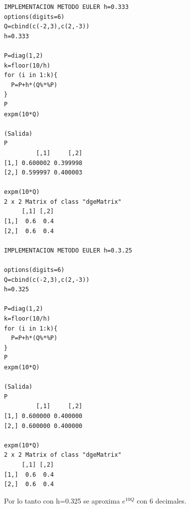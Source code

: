 \documentclass[a5paper,oneside]{amsart}
\theoremstyle{plain}
\theoremstyle{definition}
\begin{document}
\begin{lstlisting}
IMPLEMENTACION METODO EULER h=0.333
options(digits=6)
Q=cbind(c(-2,3),c(2,-3))
h=0.333

P=diag(1,2)
k=floor(10/h)
for (i in 1:k){
  P=P+h*(Q%*%P)
}
P
expm(10*Q)

(Salida)
P
         [,1]     [,2]
[1,] 0.600002 0.399998
[2,] 0.599997 0.400003

expm(10*Q)
2 x 2 Matrix of class "dgeMatrix"
     [,1] [,2]
[1,]  0.6  0.4
[2,]  0.6  0.4

IMPLEMENTACION METODO EULER h=0.3.25

options(digits=6)
Q=cbind(c(-2,3),c(2,-3))
h=0.325

P=diag(1,2)
k=floor(10/h)
for (i in 1:k){
  P=P+h*(Q%*%P)
}
P
expm(10*Q)

(Salida)
P
         [,1]     [,2]
[1,] 0.600000 0.400000
[2,] 0.600000 0.400000

expm(10*Q)
2 x 2 Matrix of class "dgeMatrix"
     [,1] [,2]
[1,]  0.6  0.4
[2,]  0.6  0.4

\end{lstlisting}

Por lo tanto con h=0.325 se aproxima $e^{10Q}$ con 6 decimales.


\end{document}
